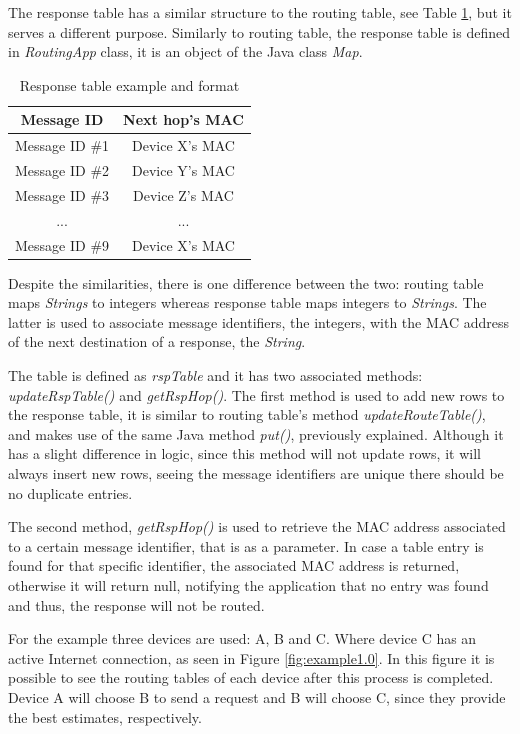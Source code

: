 The response table has a similar structure to the routing table, see Table \ref{tab:rspTables}, but it serves a different purpose. Similarly to routing table, the response table is defined in \textit{RoutingApp} class, it is an object of the Java class \textit{Map}.

\begin{table}[ht]
\centering
\bgroup
\def\arraystretch{2.5}
\begin{tabular}{|c|c|}
\hline
\textbf{Message ID} & \textbf{Next hop's MAC} \\ \hline
Message ID \#1 & Device X's MAC \\ \hline
Message ID \#2 & Device Y's MAC \\ \hline
Message ID \#3 & Device Z's MAC \\ \hline
... & ... \\ \hline
Message ID \#9 & Device X's MAC \\ \hline
\end{tabular}
\egroup
\caption{Response table example and format}
\label{tab:rspTables}
\end{table}

Despite the similarities, there is one difference between the two: routing table maps \textit{Strings} to integers whereas response table maps integers to \textit{Strings}. The latter is used to associate message identifiers, the integers, with the \gls{MAC} address of the next destination of a response, the \textit{String}.

The table is defined as \textit{rspTable} and it has two associated methods: \textit{updateRspTable()} and \textit{getRspHop()}. The first method is used to add new rows to the response table, it is similar to routing table's method \textit{updateRouteTable()}, and makes use of the same Java method \textit{put()}, previously explained. Although it has a slight difference in logic, since this method will not update rows, it will always insert new rows, seeing the message identifiers are unique there should be no duplicate entries.

The second method, \textit{getRspHop()} is used to retrieve the \gls{MAC} address associated to a certain message identifier, that is as a parameter. In case a table entry is found for that specific identifier, the associated \gls{MAC} address is returned, otherwise it will return null, notifying the application that no entry was found and thus, the response will not be routed.

For the example three devices are used: A, B and C. Where device C has an active Internet connection, as seen in Figure \ref{fig:example1.0}. In this figure it is possible to see the routing tables of each device after this process is completed. Device A will choose B to send a request and B will choose C, since they provide the best estimates, respectively.

